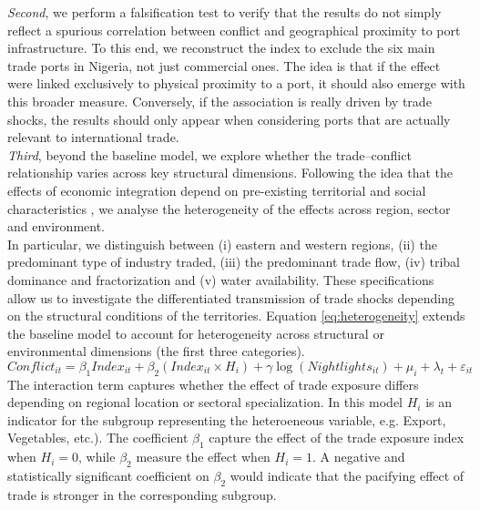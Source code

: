 \textit{Second}, we perform a falsification test to verify that the results do not simply reflect a spurious correlation between conflict and geographical proximity to port infrastructure. To this end, we reconstruct the index to exclude the six main trade ports in Nigeria, not just commercial ones. The idea is that if the effect were linked exclusively to physical proximity to a port, it should also emerge with this broader measure. Conversely, if the association is really driven by trade shocks, the results should only appear when considering ports that are actually relevant to international trade.\\

\textit{Third}, beyond the baseline model, we explore whether the trade–conflict relationship varies across key structural dimensions. Following the idea that the effects of economic integration depend on pre-existing territorial and social characteristics
\parencite{berman2015external}, we analyse the heterogeneity of the effects across region, sector and environment. \\
In particular, we distinguish between (i) eastern and western regions, (ii) the predominant type of industry traded, (iii) the predominant trade flow, (iv) tribal dominance and fractorization and (v) water availability. These specifications allow us to investigate the differentiated transmission of trade shocks depending on the structural conditions of the territories. 
Equation \ref{eq:heterogeneity} extends the baseline model to account for heterogeneity across structural or environmental dimensions (the first three categories).\\
\begin{equation}
	Conflict_{it} = \beta_1 Index_{it} + \beta_2 (Index_{it} \times H_i) + \gamma \log(Nightlights_{it}) + \mu_i + \lambda_t + \varepsilon_{it}
	\label{eq:heterogeneity}
\end{equation}
The interaction term captures whether the effect of trade exposure differs depending on regional location or sectoral specialization. In this model $H_i$ is an indicator for the subgroup representing the heteroeneous variable, e.g. Export, Vegetables, etc.). The coefficient $\beta_1$ capture the effect of the trade exposure index when $H_i=0$, while $\beta_2$ measure the effect when $H_i=1$. A negative and statistically significant coefficient on $\beta_2$  would indicate that the pacifying effect of trade is stronger in the corresponding subgroup.\\


